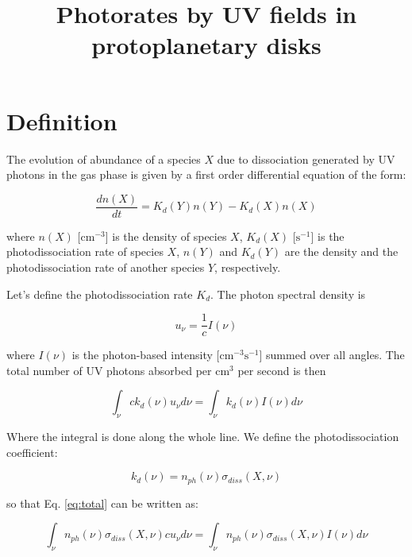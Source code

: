 \documentclass[a4paper]{article}
\title{Photorates by UV fields in protoplanetary disks}
\date{\vspace{-10ex}}
\begin{document}
\maketitle

\section{Definition}
The evolution of abundance of a species $X$ due to dissociation generated by UV photons in the gas phase is given by a first order differential equation of the form:

\begin{equation}
\label{eq:diff}%
	\frac{dn(X)}{dt} = K_d(Y)n(Y) - K_d(X)n(X)
\end{equation}

\noindent where $n(X)$ [$\mathrm{cm^{-3}}$] is the density of species $X$, $K_d(X)$ [$\mathrm{s^{-1}}$] is the photodissociation rate of species $X$, $n(Y)$ and $K_d(Y)$ are the density and the photodissociation rate of another species $Y$, respectively. 

\noindent Let's define the photodissociation rate $K_d$. The photon spectral density is

\begin{equation}
\label{eq:uv}%
	u_\nu = \frac{1}{c}I(\nu)
\end{equation}

\noindent where $I(\nu)$ is the photon-based intensity [$\mathrm{cm^{-3}s^{-1}}$] summed over all angles. The total number of UV photons absorbed per $\mathrm{cm^{3}}$ per second is then

\begin{equation}
\label{eq:total}%
	\int_\nu c k_d(\nu) u_\nu d\nu = \int_\nu k_d(\nu)I(\nu)d\nu
\end{equation}

\noindent Where the integral is done along the whole line. We define the photodissociation coefficient:

\begin{equation}
\label{eq:coef}%
	k_d(\nu) = n_{ph}(\nu)\sigma_{diss}(X, \nu)
\end{equation}

\noindent so that Eq. \ref{eq:total} can be written as:

\begin{equation}
\label{eq:total2}%
	\int_\nu  n_{ph}(\nu) \sigma_{diss}(X, \nu) c u_\nu d\nu = \int_\nu n_{ph}(\nu) \sigma_{diss}(X, \nu) I(\nu) d\nu
\end{equation}
\end{document}
